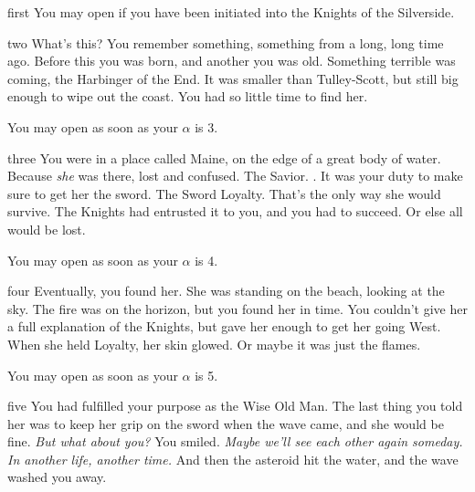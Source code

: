 \documentclass[greennotebook]{Silversiders} %
\begin{document}
\startnotebook{\nWisdomGreenTwo{}}

\begin{page}{first}
You may open  if you have been initiated into the Knights of the Silverside.
\end{page}

\begin{page}{two}
What's this? You remember something, something from a long, long time ago. Before this you was born, and another you was old. Something terrible was coming, the Harbinger of the End. It was smaller than Tulley-Scott, but still big enough to wipe out the coast. You had so little time to find her.

You may open  as soon as your $\alpha$ is 3.
\end{page}

\begin{page}{three}
You were in a place called Maine, on the edge of a great body of water. Because \emph{she} was there, lost and confused. The Savior. \cSavior{\intro}. It was your duty to make sure to get her the sword. The Sword Loyalty. That's the only way she would survive. The Knights had entrusted it to you, and you had to succeed. Or else all would be lost.

You may open  as soon as your $\alpha$ is 4.
\end{page}

\begin{page}{four}
Eventually, you found her. She was standing on the beach, looking at the sky. The fire was on the horizon, but you found her in time. You couldn't give her a full explanation of the Knights, but gave her enough to get her going West. When she held Loyalty, her skin glowed. Or maybe it was just the flames.

You may open  as soon as your $\alpha$ is 5.
\end{page}

\begin{page}{five}
You had fulfilled your purpose as the Wise Old Man. The last thing you told her was to keep her grip on the sword when the wave came, and she would be fine. \emph{But what about you?} You smiled. \emph{Maybe we'll see each other again someday. In another life, another time.} And then the asteroid hit the water, and the wave washed you away.
\end{page}

\endnotebook
\end{document}
